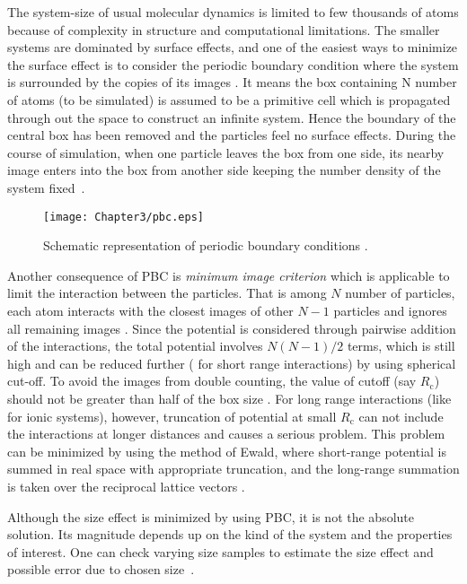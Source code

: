 The system-size of usual molecular dynamics is limited to few thousands of atoms because of complexity in structure and computational limitations. The smaller systems are dominated by surface effects, and one of the 
easiest ways to minimize the surface effect is to consider the periodic boundary condition where the system is surrounded by the copies of its images \citep{Frenkel2002}. It means the box containing N number of atoms (to be simulated) is assumed to be a primitive cell which is propagated through out the space to construct an infinite system. Hence the boundary of the central box has been removed and the particles feel no surface effects. During the course of simulation, when one particle leaves the box from one side, its nearby image enters into the box from another side keeping the number density of the system fixed~\citep{Hansen2006}. 
\begin{figure}[h!]
\centering
\texttt{[image: Chapter3/pbc.eps]}
\caption[Schematic representation of periodic boundary conditions.]{Schematic representation of periodic boundary conditions \citep{Gromacs-manual}.}
\label{pbc}
\end{figure}
Another consequence of PBC is {\it minimum image criterion} which is applicable to limit the interaction between the particles. That is among $N$ number of particles, each atom interacts with the closest images of other $N - 1$ particles and ignores all remaining images \citep{Allen1989}. Since the potential is considered through pairwise addition of the interactions, the total potential involves $N(N - 1)/2$ terms, which is still high and can be reduced further ( for short range interactions) by using spherical cut-off. To avoid the images from double counting, the value of cutoff (say $R_{\text{c}}$) should not be greater than half of the box size \citep{Ercolessi1997}. For long range interactions (like for ionic systems), however, truncation of potential at small $R_{\text{c}}$ can not include the interactions at longer distances and causes a serious problem. This problem can be minimized by using the method of Ewald, where short-range potential is summed in real space with appropriate truncation, and the long-range summation is taken over the reciprocal lattice vectors \citep{Hansen2006}.

Although the size effect is minimized by using PBC, it is not the absolute solution. Its magnitude depends up on the kind of the system and the properties of interest. One can check varying size samples to estimate the size effect and possible error due to chosen size~\citep{Poudyal2014}. 
